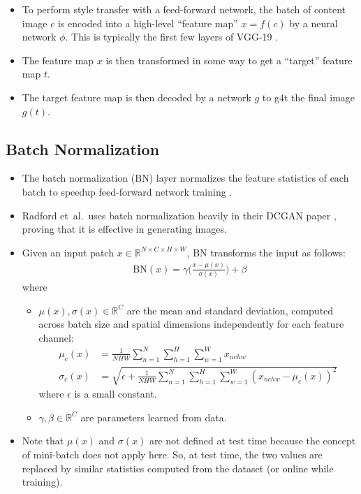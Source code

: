 \documentclass[10pt]{article}
\newcommand{\etal}{{et~al.}}
\begin{document}
  \begin{itemize}  	
  	\item To perform style transfer with a feed-forward network, the batch of content image $c$ is encoded into a high-level ``feature map'' $x = f(c)$ by a neural network $\phi$. This is typically the first few layers of VGG-19 \cite{Simonyan:2014}.

  	\item The feature map $x$ is then transformed in some way to get a ``target'' feature map $t$.

  	\item The target feature map is then decoded by a network $g$ to g4t the final image $g(t)$.
  \end{itemize}

  \subsection{Batch Normalization}

  \begin{itemize}
  	\item The batch normalization (BN) layer normalizes the feature statistics of each batch to speedup feed-forward network training \cite{Ioffe:2015}.

  	\item Radford \etal\ uses batch normalization heavily in their DCGAN paper \cite{Radford:2016}, proving that it is effective in generating images.

  	\item Given an input patch $x \in \mathbb{R}^{N \times C \times H \times W}$, BN transforms the input as follows:
  	\begin{align*}
  		\mathrm{BN}(x) = \gamma \bigg( \frac{x - \mu(x)}{\sigma(x)} \bigg) + \beta
  	\end{align*}
  	where
  	\begin{itemize}
  		\item  $\mu(x), \sigma(x) \in \mathbb{R}^C$ are the mean and standard deviation, computed across batch size and spatial dimensions independently for each feature channel:
  		\begin{align*}
  			\mu_c(x) 
  			&= \frac{1}{NHW} \sum_{n=1}^N \sum_{h=1}^H \sum_{w=1}^W x_{nchw}\\
  			\sigma_c(x)
  			&= \sqrt{\epsilon + \frac{1}{NHW} \sum_{n=1}^N \sum_{h=1}^H \sum_{w=1}^W (x_{nchw} - \mu_c(x))^2 }
  		\end{align*}
  		where $\epsilon$ is a small constant.

  		\item $\gamma, \beta \in \mathbb{R}^C$ are parameters learned from data.
  	\end{itemize}

  	\item Note that $\mu(x)$ and $\sigma(x)$ are not defined at test time because the concept of mini-batch does not apply here. So, at test time, the two values are replaced by similar statistics computed from the dataset (or online while training).
  \end{itemize}
\end{document}
